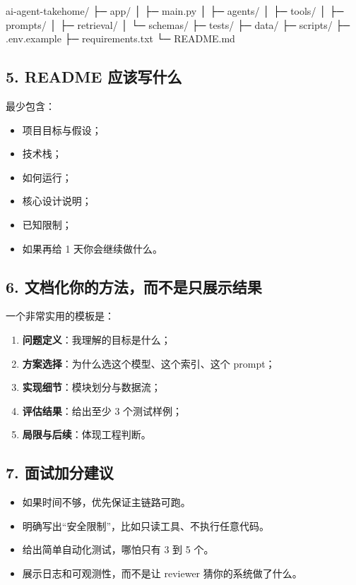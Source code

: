 \begin{codeblock}
ai-agent-takehome/
├─ app/
│  ├─ main.py
│  ├─ agents/
│  ├─ tools/
│  ├─ prompts/
│  ├─ retrieval/
│  └─ schemas/
├─ tests/
├─ data/
├─ scripts/
├─ .env.example
├─ requirements.txt
└─ README.md
\end{codeblock}

\subsection{5. README 应该写什么}
最少包含：

\begin{itemize}[leftmargin=2em]
\item 项目目标与假设；
\item 技术栈；
\item 如何运行；
\item 核心设计说明；
\item 已知限制；
\item 如果再给 1 天你会继续做什么。
\end{itemize}

\subsection{6. 文档化你的方法，而不是只展示结果}
一个非常实用的模板是：

\begin{enumerate}[leftmargin=2em]
\item \textbf{问题定义}：我理解的目标是什么；
\item \textbf{方案选择}：为什么选这个模型、这个索引、这个 prompt；
\item \textbf{实现细节}：模块划分与数据流；
\item \textbf{评估结果}：给出至少 3 个测试样例；
\item \textbf{局限与后续}：体现工程判断。
\end{enumerate}

\subsection{7. 面试加分建议}
\begin{itemize}[leftmargin=2em]
\item 如果时间不够，优先保证主链路可跑。
\item 明确写出``安全限制''，比如只读工具、不执行任意代码。
\item 给出简单自动化测试，哪怕只有 3 到 5 个。
\item 展示日志和可观测性，而不是让 reviewer 猜你的系统做了什么。
\end{itemize}

